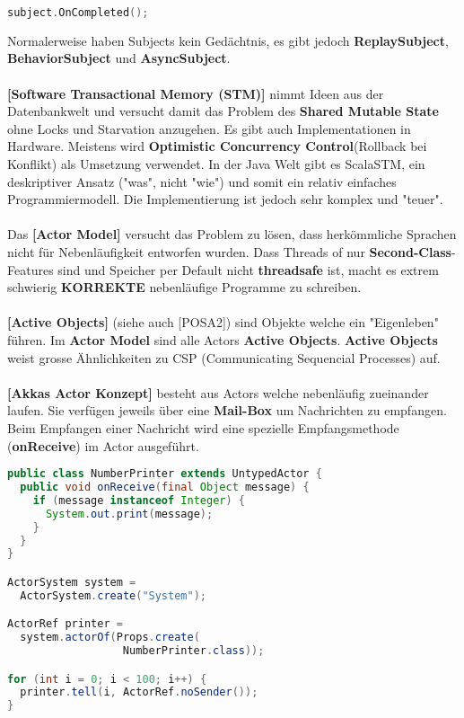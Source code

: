 \documentclass[8pt]{extarticle}
\let\oldtextbf\textbf
\renewcommand{\textbf}{\tiny\oldtextbf}
\begin{document}
\begin{multicols*}{5}
\begin{lstlisting}[language=c++]
subject.OnCompleted();
\end{lstlisting}
Normalerweise haben Subjects kein Gedächtnis, es gibt jedoch \textbf{ReplaySubject}, \textbf{BehaviorSubject} und \textbf{AsyncSubject}.\\\\
\textbf{[Software Transactional Memory (STM)]} nimmt Ideen aus der Datenbankwelt und versucht damit das Problem des \textbf{Shared Mutable State} ohne Locks und Starvation anzugehen. Es gibt auch Implementationen in Hardware. Meistens wird \textbf{Optimistic Concurrency Control}(Rollback bei Konflikt) als Umsetzung verwendet. In der Java Welt gibt es ScalaSTM, ein deskriptiver Ansatz ("was", nicht "wie") und somit ein relativ einfaches Programmiermodell. Die Implementierung ist jedoch sehr komplex und "teuer".\\\\
Das \textbf{[Actor Model]} versucht das Problem zu lösen, dass herkömmliche Sprachen nicht für Nebenläufigkeit entworfen wurden. Dass Threads of nur \textbf{Second-Class}-Features sind und Speicher per Default nicht \textbf{threadsafe} ist, macht es extrem schwierig \textbf{KORREKTE} nebenläufige Programme zu schreiben.\\\\
\textbf{[Active Objects]} (siehe auch [POSA2]) sind Objekte welche ein "Eigenleben" führen. Im \textbf{Actor Model} sind alle Actors \textbf{Active Objects}. \textbf{Active Objects} weist grosse Ähnlichkeiten zu CSP (Communicating Sequencial Processes) auf.\\\\
\textbf{[Akkas Actor Konzept]} besteht aus Actors welche nebenläufig zueinander laufen. Sie verfügen jeweils über eine \textbf{Mail-Box} um Nachrichten zu empfangen. Beim Empfangen einer Nachricht wird eine spezielle Empfangsmethode (\textbf{onReceive}) im Actor ausgeführt.
\begin{lstlisting}[language=java]
public class NumberPrinter extends UntypedActor {
  public void onReceive(final Object message) {
    if (message instanceof Integer) {
      System.out.print(message);
    }
  }
}

ActorSystem system =
  ActorSystem.create("System");

ActorRef printer =
  system.actorOf(Props.create(
                  NumberPrinter.class));

for (int i = 0; i < 100; i++) {
  printer.tell(i, ActorRef.noSender());
}


\end{lstlisting}
\end{multicols*}
\end{document}
